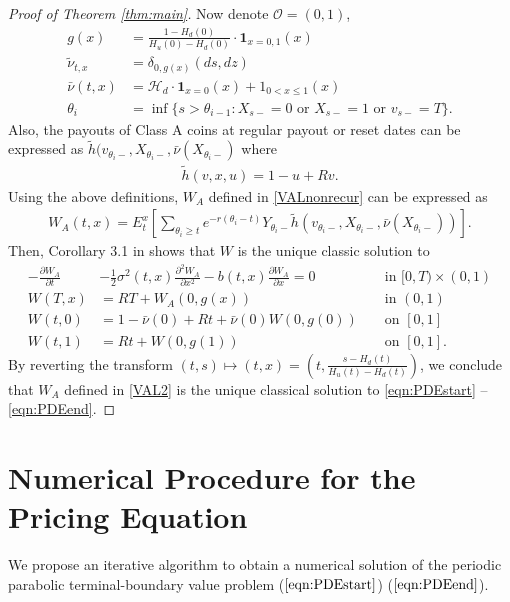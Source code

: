 \documentclass[draft, noinfoline]{ectaart}
\numberwithin{equation}{section}
\theoremstyle{plain}
\newcommand{\der}[2]{\ensuremath{\frac{\partial #1}{\partial #2}}}
\newcommand{\dder}[2]{\ensuremath{\frac{\partial^2 #1}{\partial #2^2}}}
\begin{document}
\begin{appendices}
\begin{proof}[Proof of Theorem \ref{thm:main}]
	Now denote $\mathcal{O}=(0,1)$,
	\begin{align*}
		g(x)&=\frac{1-H_d(0)}{H_u(0)-H_d(0)}\cdot\mathbf{1}_{x=0,1}(x)\\
		\tilde{\nu}_{t,x}&=\delta_{0,g(x)}(ds,dz)\\
		\bar{\nu}(t,x)&=\mathcal{H}_d\cdot \mathbf{1}_{x=0}(x)+1_{0<x\le 1}(x)\\
		\theta_i&=\inf\{s>\theta_{i-1}:X_{s-}=0\text{ or }X_{s-}=1\text{ or }v_{s-}=T\}.
	\end{align*}
	Also, the payouts of Class A coins at regular payout or reset dates can be expressed as $\tilde{h}(v_{\theta_i-},X_{\theta_i-},\bar{\nu}(X_{\theta_i-})$ where
	\begin{align*}
		\tilde{h}(v,x,u)=1-u+Rv.
	\end{align*}
	Using the above definitions, $W_A$ defined in \eqref{VALnonrecur} can be expressed as
	\begin{align*}
		W_A(t,x)=E_t^x\left[\sum_{\theta_i\ge t}e^{-r(\theta_i-t)}Y_{\theta_i-}\tilde{h}(v_{\theta_i-},X_{\theta_i-},\bar{\nu}(X_{\theta_i-}))\right].
	\end{align*}
	Then, Corollary 3.1 in \cite{dai_stochastic_2017} shows that $W$ is the unique classic solution to
	\begin{align*}
		-\der{W_A}{t}&-\frac{1}{2}\sigma^2(t,x)\dder{W_A}{x}-b(t,x)\der{W_A}{x}=0 && \text{ in }[0,T)\times(0,1)\\
		W(T,x)&=RT+W_A(0,g(x)) && \text{ in }(0,1)\\
		W(t,0)&=1-\bar{\nu}(0)+Rt+\bar{\nu}(0)W(0,g(0)) && \text{ on }[0,1]\\
		W(t,1)&=Rt+W(0,g(1)) && \text{ on }[0,1].
	\end{align*}
	By reverting the transform $(t,s)\mapsto(t,x)=\left(t,\frac{s-H_d(t)}{H_u(t)-H_d(t)}\right)$, we conclude that $W_A$ defined in \eqref{VAL2} is the unique classical solution to \eqref{eqn:PDEstart} -- \eqref{eqn:PDEend}.
\end{proof}

\section{Numerical Procedure for the Pricing Equation}\label{subsec:Numerical-Procedure-for}

We propose an iterative algorithm to obtain a numerical solution of the periodic parabolic terminal-boundary value problem ($\ref{eqn:PDEstart}$) \textendash{} ($\ref{eqn:PDEend}$).


\end{appendices}
\end{document}
